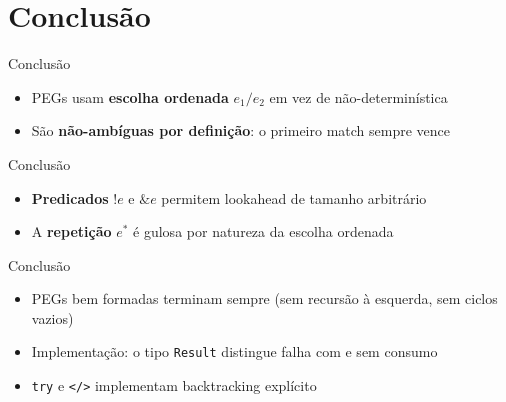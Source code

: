 \section{Conclusão}\label{conclusuxe3o}

\begin{frame}{Conclusão}

    \begin{itemize}

        \item
        PEGs usam \textbf{escolha ordenada} \(e_1 / e_2\) em vez de
        não-determinística
        \item
        São \textbf{não-ambíguas por definição}: o primeiro match sempre vence
    \end{itemize}
\end{frame}

\begin{frame}{Conclusão}

    \begin{itemize}

        \item
        \textbf{Predicados} \(!e\) e \(\&e\) permitem lookahead de tamanho
        arbitrário
        \item
        A \textbf{repetição} \(e^*\) é gulosa por natureza da escolha ordenada
    \end{itemize}
\end{frame}

\begin{frame}[fragile]{Conclusão}

    \begin{itemize}

        \item
        PEGs bem formadas terminam sempre (sem recursão à esquerda, sem ciclos
        vazios)
        \item
        Implementação: o tipo \texttt{Result} distingue falha
        com e sem consumo
        \item
        \texttt{try} e \texttt{</>}
        implementam backtracking explícito
    \end{itemize}
\end{frame}
